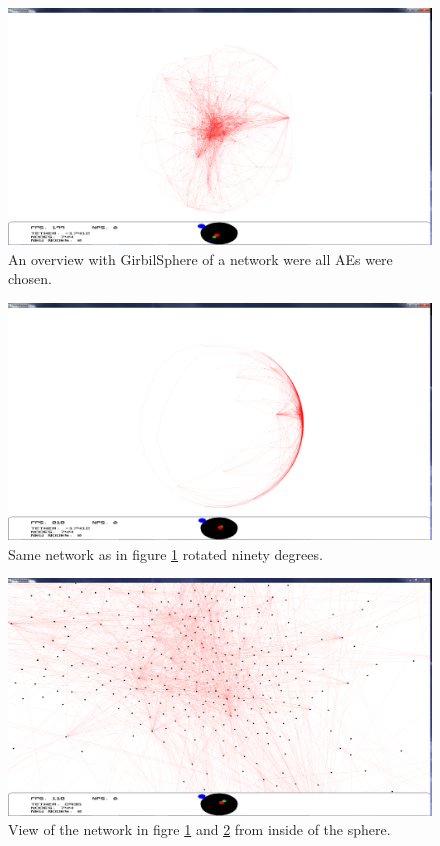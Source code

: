 \documentclass[a4paper,11pt]{kth-mag}
\begin{document}
\begin{figure}[!htbp]
	\centering
	\includegraphics[scale=0.3]{SesammVisualAppPics/SphericalView/AE/AE1}
	\caption{An overview with GirbilSphere of a network were all AEs were chosen.}
	\label{fig:AllaAE1SPW}
\end{figure}

\begin{figure}[!htbp]
	\centering
	\includegraphics[scale=0.3]{SesammVisualAppPics/SphericalView/AE/AE2}
	\caption{Same network as in figure \ref{fig:AllaAE1SPW} rotated ninety degrees.}
	\label{fig:AllaAE2SPW}
\end{figure}

\begin{figure}[!htbp]
	\centering
	\includegraphics[scale=0.3]{SesammVisualAppPics/SphericalView/AE/AE5}
	\caption{View of the network in figre \ref{fig:AllaAE1SPW} and \ref{fig:AllaAE2SPW} from inside of the sphere.}
	\label{fig:AllaAE3SPW}
\end{figure}
\newpage
\end{document}
